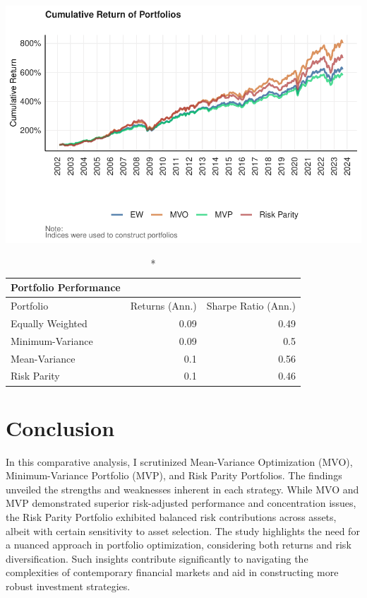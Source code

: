 \documentclass[12pt,preprint, authoryear]{elsarticle}
\let\origfigure\figure
\let\endorigfigure\endfigure
\renewenvironment{figure}[1][2] {
    \expandafter\origfigure\expandafter[H]
} {
    \endorigfigure
}
\numberwithin{equation}{section}
\numberwithin{figure}{section}
\numberwithin{table}{section}
\begin{document}
\begin{figure}[H]

{\centering \includegraphics{Finmetrics_Project_files/figure-latex/Figure2-1} 

}

\caption{Cumulative Returns \label{Figure2}}\label{fig:Figure2}
\end{figure}

\begin{longtable}{lrr}
\caption*{
{\large Portfolio Performance}
} \\ 
\toprule
Portfolio & Returns (Ann.) & Sharpe Ratio (Ann.) \\ 
\midrule\addlinespace[2.5pt]
Equally Weighted & 0.09 & 0.49 \\ 
Minimum-Variance & 0.09 & 0.5 \\ 
Mean-Variance & 0.1 & 0.56 \\ 
Risk Parity & 0.1 & 0.46 \\ 
\bottomrule
\end{longtable}

\hypertarget{conclusion}{%
\section*{Conclusion}\label{conclusion}}

In this comparative analysis, I scrutinized Mean-Variance Optimization
(MVO), Minimum-Variance Portfolio (MVP), and Risk Parity Portfolios. The
findings unveiled the strengths and weaknesses inherent in each
strategy. While MVO and MVP demonstrated superior risk-adjusted
performance and concentration issues, the Risk Parity Portfolio
exhibited balanced risk contributions across assets, albeit with certain
sensitivity to asset selection. The study highlights the need for a
nuanced approach in portfolio optimization, considering both returns and
risk diversification. Such insights contribute significantly to
navigating the complexities of contemporary financial markets and aid in
constructing more robust investment strategies.
\end{document}
